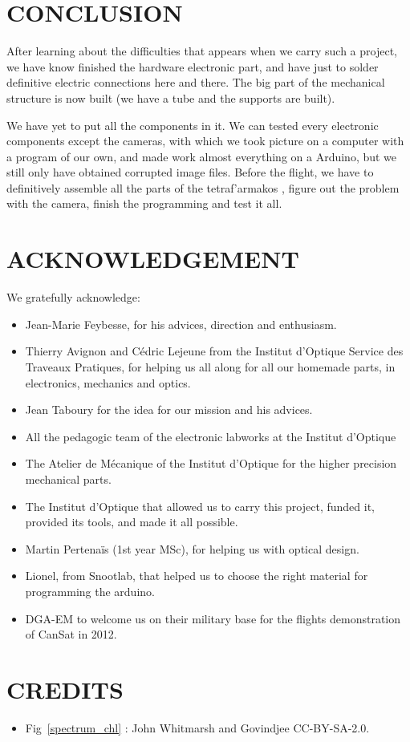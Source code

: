\documentclass[twocolumn,10pt]{article}
\newcommand\tet{\textgreek{tetraf'armakos} }
\begin{document}
\section{CONCLUSION}
\par After learning about the difficulties that appears when we carry such a project, we have know finished the hardware electronic part, and have just to solder definitive electric connections here and there. The big part of the mechanical structure is now built (we have a tube and the supports are built). 
\par We have yet to put all the components in it. We can tested every electronic components except the cameras, with which we took picture on a computer with a program of our own, and made work almost everything on a Arduino, but we still only have obtained corrupted image files. Before the flight, we have to definitively assemble all the parts of the \tet, figure out the problem with the camera, finish the programming and test it all.
\section*{ACKNOWLEDGEMENT}
We gratefully acknowledge: 
\begin{itemize}
\item Jean-Marie Feybesse, for his advices, direction and enthusiasm.
\item Thierry Avignon and Cédric Lejeune from the Institut d'Optique Service des Traveaux Pratiques, for helping us all along for all our homemade parts, in electronics, mechanics and optics.
\item Jean Taboury for the idea for our mission and his advices.
\item All the pedagogic team of the electronic labworks at the Institut d'Optique
\item The Atelier de Mécanique of the Institut d'Optique for the higher precision mechanical parts.
\item The Institut d'Optique that allowed us to carry this project, funded it, provided its tools, and made it all possible.
\item Martin Pertenaïs (1st year MSc), for helping us with optical design.
\item Lionel, from Snootlab, that helped us to choose the right material for programming the arduino.
\item DGA-EM to welcome us on their military base for the flights demonstration of CanSat in 2012. 
\end{itemize}
\section*{CREDITS}
\begin{itemize}
\item \small Fig~\ref{spectrum_chl} : John Whitmarsh and Govindjee CC-BY-SA-2.0.
\end{itemize}
\end{document}
